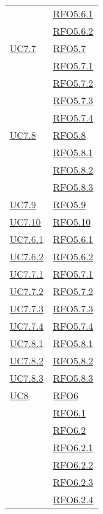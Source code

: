 \begin{longtable}{|>{\centering}m{5cm}|m{5cm}<{\centering}|}
& \hyperlink{RFO5.6.1}{RFO5.6.1}\\
& \hyperlink{RFO5.6.2}{RFO5.6.2}\\\hline
\hyperlink{UC7.7}{UC7.7} & \hyperlink{RFO5.7}{RFO5.7}\\
& \hyperlink{RFO5.7.1}{RFO5.7.1}\\
& \hyperlink{RFO5.7.2}{RFO5.7.2}\\
& \hyperlink{RFO5.7.3}{RFO5.7.3}\\
& \hyperlink{RFO5.7.4}{RFO5.7.4}\\\hline
\hyperlink{UC7.8}{UC7.8} & \hyperlink{RFO5.8}{RFO5.8}\\
& \hyperlink{RFO5.8.1}{RFO5.8.1}\\
& \hyperlink{RFO5.8.2}{RFO5.8.2}\\
& \hyperlink{RFO5.8.3}{RFO5.8.3}\\\hline
\hyperlink{UC7.9}{UC7.9} & \hyperlink{RFO5.9}{RFO5.9}\\\hline
\hyperlink{UC7.10}{UC7.10} & \hyperlink{RFO5.10}{RFO5.10}\\\hline
\hyperlink{UC7.6.1}{UC7.6.1} & \hyperlink{RFO5.6.1}{RFO5.6.1}\\\hline
\hyperlink{UC7.6.2}{UC7.6.2} & \hyperlink{RFO5.6.2}{RFO5.6.2}\\\hline
\hyperlink{UC7.7.1}{UC7.7.1} & \hyperlink{RFO5.7.1}{RFO5.7.1}\\\hline
\hyperlink{UC7.7.2}{UC7.7.2} & \hyperlink{RFO5.7.2}{RFO5.7.2}\\\hline
\hyperlink{UC7.7.3}{UC7.7.3} & \hyperlink{RFO5.7.3}{RFO5.7.3}\\\hline
\hyperlink{UC7.7.4}{UC7.7.4} & \hyperlink{RFO5.7.4}{RFO5.7.4}\\\hline
\hyperlink{UC7.8.1}{UC7.8.1} & \hyperlink{RFO5.8.1}{RFO5.8.1}\\\hline
\hyperlink{UC7.8.2}{UC7.8.2} & \hyperlink{RFO5.8.2}{RFO5.8.2}\\\hline
\hyperlink{UC7.8.3}{UC7.8.3} & \hyperlink{RFO5.8.3}{RFO5.8.3}\\\hline
\hyperlink{UC8}{UC8} & \hyperlink{RFO6}{RFO6}\\
& \hyperlink{RFO6.1}{RFO6.1}\\
& \hyperlink{RFO6.2}{RFO6.2}\\
& \hyperlink{RFO6.2.1}{RFO6.2.1}\\
& \hyperlink{RFO6.2.2}{RFO6.2.2}\\
& \hyperlink{RFO6.2.3}{RFO6.2.3}\\
& \hyperlink{RFO6.2.4}{RFO6.2.4}\\

\end{longtable}
